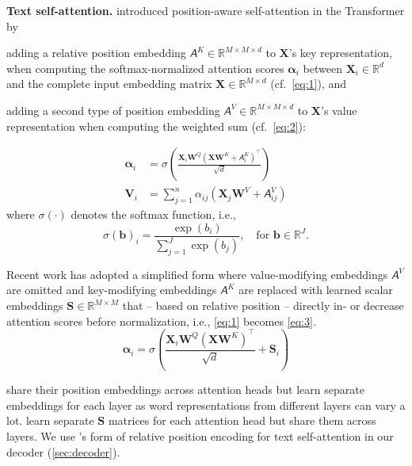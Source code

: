 \documentclass[11pt]{article}
\newcommand{\para}[1]{\noindent\textbf{#1.}}
\newcommand{\R}{\mathbb{R}}
\newcommand{\softmax}[1]{\sigma\left(#1\right)}
\newcommand{\mat}{\bm}  \let\oldvec\vec
\renewcommand{\vec}{\bm}
\newcommand{\tens}[1]{\bm{\mathsfit{#1}}}
\begin{document}
\para{Text self-attention}
\citet{shaw-etal-2018-self} introduced position-aware self-attention in the Transformer
by
\begin{enumerate*}[label={(\roman*)}]
  \item adding a relative position embedding $\tens{A}^K \in \R^{M\times M\times d}$ to $\mat{X}$'s key representation, when computing the softmax-normalized attention scores $\vec{\alpha}_{i}$ between $\vec{X}_i\in\R^d$ and the complete input embedding matrix $\mat{X}\in\R^{M\times d}$ (cf.\ \cref{eq:1}), and
  \item adding a second type of position embedding $\tens{A}^V\in\R^{M\times M\times d}$ to $\mat{X}$'s value representation when computing the weighted sum (cf.\ \cref{eq:2}):
\end{enumerate*}
\begin{align}
  \label{eq:1}
  \vec{\alpha}_{i} &= \softmax{\frac{\vec{X}_i\mat{W}^Q (\mat{X}\mat{W}^K + \tens{A}^K_{i})^\top}{\sqrt{d}}} \\
  \label{eq:2}
  \vec{V}_i &= \sum_{j=1}^n \alpha_{ij} (\vec{X}_j\mat{W}^V + \tens{A}_{ij}^V)
\end{align}
where $\softmax{\cdot}$ denotes the softmax function, i.e.,
\begin{displaymath}
	\softmax{\vec{b}}_i = \frac{\exp\left(b_i\right)}{\sum_{j=1}^{J} \exp\left(b_j\right)},\quad \text{for $\vec{b}\in\R^{J}$.}
\end{displaymath}

Recent work \citep{raffel19} has adopted a simplified form
where value-modifying embeddings $\tens{A}^V$ are omitted
and key-modifying embeddings $\tens{A}^K$ are replaced
with learned scalar embeddings $\mat{S} \in \R^{M\times M}$ that -- based on relative position -- directly in- or decrease attention scores before normalization,
i.e., \cref{eq:1} becomes \cref{eq:3}.
\begin{equation}
  \label{eq:3}
  \vec{\alpha}_{i} = \softmax{\frac{\vec{X}_i\mat{W}^Q (\mat{X}\mat{W}^K)^\top}{\sqrt{d}} + \vec{S}_{i}}
\end{equation}

\citet{shaw-etal-2018-self} share their position embeddings across attention heads
but learn separate embeddings for each layer
as word representations from different layers can vary a lot.
\citet{raffel19} learn separate $\mat{S}$ matrices for each attention head but share them across layers.
We use \citet{raffel19}'s form of relative position encoding for text self-attention in our decoder (\cref{sec:decoder}).
\end{document}
